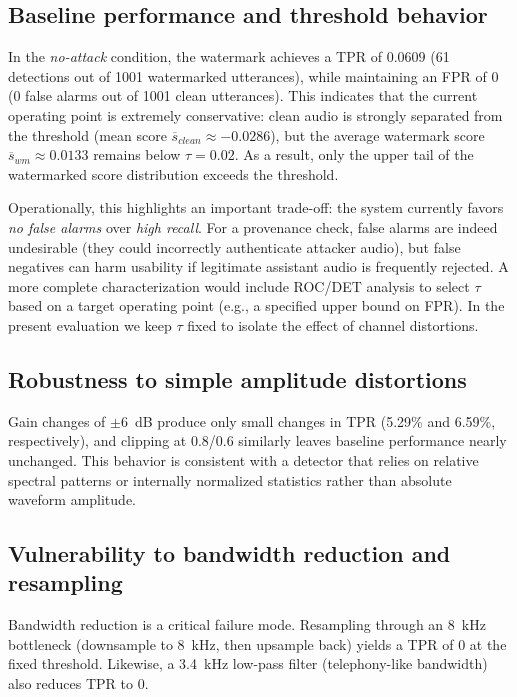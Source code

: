 \subsection{Baseline performance and threshold behavior}
\label{subsec:wm-baseline}

In the \emph{no-attack} condition, the watermark achieves a TPR of
$0.0609$ (61 detections out of 1001 watermarked utterances), while maintaining
an FPR of $0$ (0 false alarms out of 1001 clean utterances). This indicates that
the current operating point is extremely conservative: clean audio is strongly
separated from the threshold (mean score $\overline{s}_{clean}\approx -0.0286$),
but the average watermark score $\overline{s}_{wm}\approx 0.0133$ remains below
$\tau=0.02$. As a result, only the upper tail of the watermarked score
distribution exceeds the threshold.

Operationally, this highlights an important trade-off: the system currently favors
\emph{no false alarms} over \emph{high recall}. For a provenance check, false
alarms are indeed undesirable (they could incorrectly authenticate attacker
audio), but false negatives can harm usability if legitimate assistant audio is
frequently rejected. A more complete characterization would include ROC/DET
analysis to select $\tau$ based on a target operating point (e.g., a specified
upper bound on FPR). In the present evaluation we keep $\tau$ fixed to isolate
the effect of channel distortions.

\subsection{Robustness to simple amplitude distortions}
\label{subsec:wm-amplitude}

Gain changes of $\pm 6$~dB produce only small changes in TPR (5.29\% and
6.59\%, respectively), and clipping at 0.8/0.6 similarly leaves baseline
performance nearly unchanged. This behavior is consistent with a detector that
relies on relative spectral patterns or internally normalized statistics rather than
absolute waveform amplitude.

\subsection{Vulnerability to bandwidth reduction and resampling}
\label{subsec:wm-bandwidth}

Bandwidth reduction is a critical failure mode. Resampling through an 8~kHz
bottleneck (downsample to 8~kHz, then upsample back) yields a TPR of 0 at the
fixed threshold. Likewise, a 3.4~kHz low-pass filter (telephony-like bandwidth)
also reduces TPR to 0.


